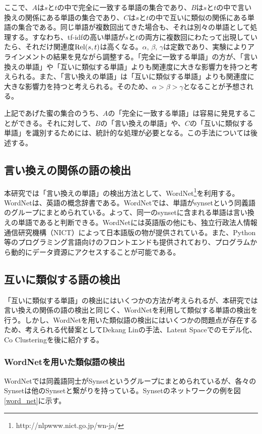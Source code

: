 \documentclass[12pt]{jarticle}
\begin{document}
ここで、$A$は$s$と$t$の中で完全に一致する単語の集合であり、$B$は$s$と$t$の中で言い換えの関係にある単語の集合であり、$C$は$s$と$t$の中で互いに類似の関係にある単語の集合である。同じ単語が複数回出てきた場合も、それは別々の単語として処理する。すなわち、tf-idfの高い単語が$s$と$t$の両方に複数回にわたって出現していたら、それだけ関連度${\rm Rel}(s, t)$は高くなる。$\alpha$, $\beta$, $\gamma$は定数であり、実験によりアラインメントの結果を見ながら調整する。「完全に一致する単語」の方が、「言い換えの単語」や「互いに類似する単語」よりも関連度に大きな影響力を持つと考えられる。また、「言い換えの単語」は「互いに類似する単語」よりも関連度に大きな影響力を持つと考えられる。そのため、$\alpha > \beta > \gamma$となることが予想される。

上記であげた蜜の集合のうち、$A$の「完全に一致する単語」は容易に発見することができる。それに対して、$B$の「言い換えの単語」や、$C$の「互いに類似する単語」を識別するためには、統計的な処理が必要となる。この手法については後述する。

\subsection{言い換えの関係の語の検出}
本研究では「言い換えの単語」の検出方法として、WordNet\footnote{http://nlpwww.nict.go.jp/wn-ja/}を利用する。WordNetは、英語の概念辞書である。WordNetでは、単語がsynsetという同義語のグループにまとめられている。よって、同一のsynsetに含まれる単語は言い換えの単語であると判断できる。WordNetには英語版の他にも、独立行政法人情報通信研究機構（NICT）によって日本語版の物が提供されている。また、Python等のプログラミング言語向けのフロントエンドも提供されており、プログラムから動的にデータ資源にアクセスすることが可能である。

\subsection{互いに類似する語の検出}
「互いに類似する単語」の検出にはいくつかの方法が考えられるが、本研究では言い換えの関係の語の検出と同じく、WordNetを利用して類似する単語の検出を行う。しかし、WordNetを用いた類似語の検出にはいくつかの問題点が存在するため、考えられる代替案としてDekang Linの手法\cite{DekangLin}、Latent Spaceでのモデル化\cite{LatentSpace}、Co Clustering\cite{CoClustering}を後に紹介する。

\subsubsection{WordNetを用いた類似語の検出}
WordNetでは同義語同士がSynsetというグループにまとめられているが、各々のSynsetは他のSynsetと繋がりを持っている。Synsetのネットワークの例を図\ref{word_net}に示す。
\end{document}
